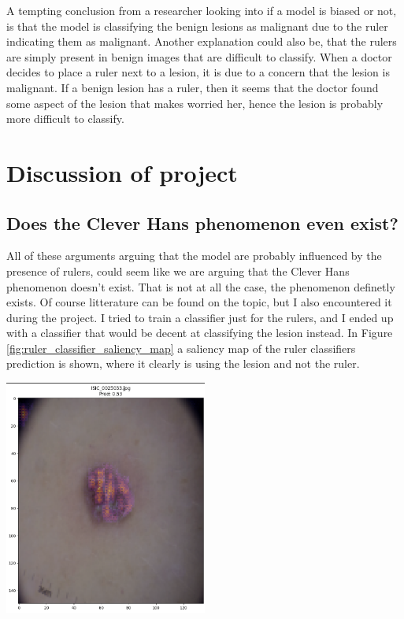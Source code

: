 A tempting conclusion from a researcher looking into if a model is biased or not,
is that the model is classifying the benign lesions as malignant due to the ruler indicating them 
as malignant.
Another explanation could also be, that the rulers are simply present in benign images that are 
difficult to classify.
When a doctor decides to place a ruler next to a lesion,
it is due to a concern that the lesion is malignant.
If a benign lesion has a ruler, then it seems that the doctor found 
some aspect of the lesion that makes worried her, 
hence the lesion is probably more difficult to classify.

\section{Discussion of project}
\subsection{Does the Clever Hans phenomenon even exist?}
All of these arguments arguing that the model are probably influenced by the presence of rulers,
could seem like we are arguing that the Clever Hans phenomenon doesn't exist.
That is not at all the case, the phenomenon definetly exists.
Of course litterature can be found on the topic, but I also encountered it during the project.
I tried to train a classifier just for the rulers, and I ended up with a classifier that would
be decent at classifying the lesion instead. 
In Figure \ref{fig:ruler_classifier_saliency_map} a saliency map of the ruler classifiers prediction is shown,
where it clearly is using the lesion and not the ruler.

\begin{center}
    \includegraphics[width=0.5\textwidth]{images/ruler_classifier_saliency.png}
    \label{fig:ruler_classifier_saliency_map}
\end{center}

